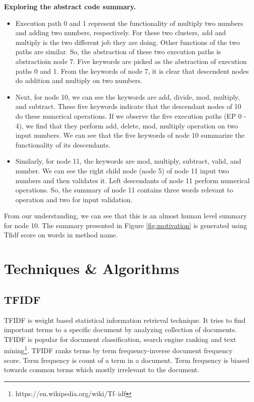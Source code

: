 \textbf{Exploring the abstract code summary.}
\begin{itemize}
    \item Execution path 0 and 1 represent the functionality of multiply two numbers and adding two numbers, respectively. For these two clusters, add and multiply is the two different job they are doing. Other functions of the two paths are similar. So, the abstraction of these two execution paths is abstractioin node 7. Five keywords are picked as the abstraction of execution paths 0 and 1. From the keywords of node 7, it is clear that descendent nodes do addition and multiply on two numbers.
    \item Next, for node 10, we can see the keywords are add, divide, mod, multiply, and subtract. These five keywords indicate that the descendant nodes of 10 do these numerical operations. If we observe the five execution paths (EP 0 - 4), we find that they perform add, delete, mod, multiply operation on two input numbers. We can see that the five keywords of node 10 summarize the functionality of its descendants.
    \item Similarly, for node 11, the keywords are mod, multiply, subtract, valid, and number. We can see the right child node (node 5) of node 11 input two numbers and then validates it. Left descendants of node 11 perform numerical operations. So, the summary of node 11 contains three words relevant to operation and two for input validation.
\end{itemize}
   From our understanding, we can see that this is an almost human level summary for node 10. The summary presented in Figure \ref{fig:motivation} is generated using Tfidf score on words in method name. 

\section{ Techniques \& Algorithms}
\label{background:techniques}
\subsection{TFIDF}
TFIDF is weight based statistical information retrieval technique. It tries to find important terms to a specific document by analyzing collection of documents. TFIDF is popular for document classification, search engine ranking and text mining\footnote{https://en.wikipedia.org/wiki/Tf–idf}. TFIDF ranks terms by term frequency-inverse document frequency score. Term frequency is count of a term in a document. Term frequency is biased towards common terms which mostly irrelevant to the document. 

